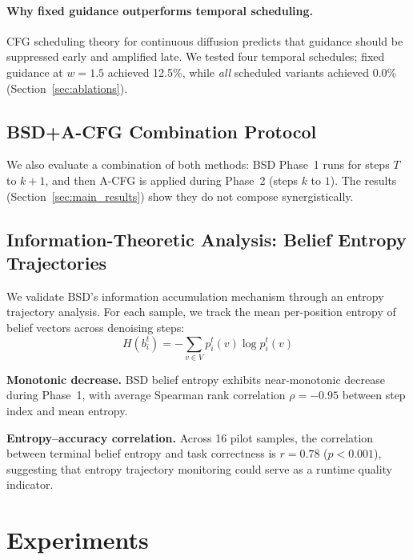 \documentclass{article}
\begin{document}
\paragraph{Why fixed guidance outperforms temporal scheduling.} CFG scheduling theory for continuous diffusion \citep{rojas2025cfgschedule} predicts that guidance should be suppressed early and amplified late. We tested four temporal schedules; fixed guidance at $w = 1.5$ achieved 12.5\%, while \emph{all} scheduled variants achieved 0.0\% (Section~\ref{sec:ablations}).

\subsection{BSD+A-CFG Combination Protocol}

We also evaluate a combination of both methods: BSD Phase~1 runs for steps $T$ to $k{+}1$, and then A-CFG is applied during Phase~2 (steps $k$ to $1$). The results (Section~\ref{sec:main_results}) show they do not compose synergistically.

\subsection{Information-Theoretic Analysis: Belief Entropy Trajectories}

We validate BSD's information accumulation mechanism through an entropy trajectory analysis. For each sample, we track the mean per-position entropy of belief vectors across denoising steps:
\begin{equation}
H(b_i^t) = -\sum_{v \in V} p_i^t(v) \log p_i^t(v)
\label{eq:entropy}
\end{equation}

\textbf{Monotonic decrease.} BSD belief entropy exhibits near-monotonic decrease during Phase~1, with average Spearman rank correlation $\rho = -0.95$ between step index and mean entropy.

\textbf{Entropy--accuracy correlation.} Across 16 pilot samples, the correlation between terminal belief entropy and task correctness is $r = 0.78$ ($p < 0.001$), suggesting that entropy trajectory monitoring could serve as a runtime quality indicator.


\section{Experiments}
\label{sec:experiments}
\end{document}
